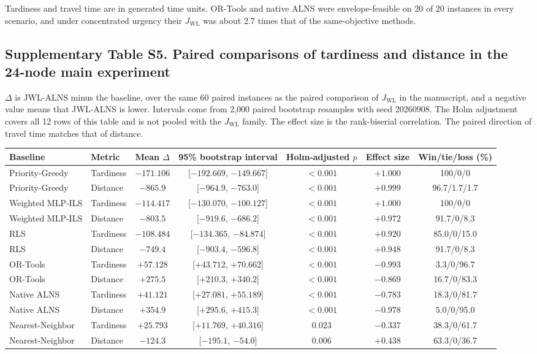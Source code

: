 \documentclass[11pt,a4paper]{article}
\begin{document}
Tardiness and travel time are in generated time units. OR-Tools and native ALNS were envelope-feasible on 20 of 20 instances in every scenario, and under concentrated urgency their $J_{\mathrm{WL}}$ was about 2.7 times that of the same-objective methods.

\subsection*{Supplementary Table S5. Paired comparisons of tardiness and distance in the 24-node main experiment}

$\Delta$ is JWL-ALNS minus the baseline, over the same 60 paired instances as the paired comparison of $J_{\mathrm{WL}}$ in the manuscript, and a negative value means that JWL-ALNS is lower. Intervals come from 2,000 paired bootstrap resamples with seed 20260908. The Holm adjustment covers all 12 rows of this table and is not pooled with the $J_{\mathrm{WL}}$ family. The effect size is the rank-biserial correlation. The paired direction of travel time matches that of distance.

\begin{center}
\scriptsize
\setlength{\tabcolsep}{3.5pt}
\begin{tabular}{llccccc}
\toprule
Baseline & Metric & Mean $\Delta$ & 95\% bootstrap interval & Holm-adjusted $p$ & Effect size & Win/tie/loss (\%) \\
\midrule
Priority-Greedy & Tardiness & $-171.106$ & [$-192.669$, $-149.667$] & $<0.001$ & $+1.000$ & 100/0/0 \\
Priority-Greedy & Distance & $-865.9$ & [$-964.9$, $-763.0$] & $<0.001$ & $+0.999$ & 96.7/1.7/1.7 \\
Weighted MLP-ILS & Tardiness & $-114.417$ & [$-130.070$, $-100.127$] & $<0.001$ & $+1.000$ & 100/0/0 \\
Weighted MLP-ILS & Distance & $-803.5$ & [$-919.6$, $-686.2$] & $<0.001$ & $+0.972$ & 91.7/0/8.3 \\
RLS & Tardiness & $-108.484$ & [$-134.365$, $-84.874$] & $<0.001$ & $+0.920$ & 85.0/0/15.0 \\
RLS & Distance & $-749.4$ & [$-903.4$, $-596.8$] & $<0.001$ & $+0.948$ & 91.7/0/8.3 \\
OR-Tools & Tardiness & $+57.128$ & [$+43.712$, $+70.662$] & $<0.001$ & $-0.993$ & 3.3/0/96.7 \\
OR-Tools & Distance & $+275.5$ & [$+210.3$, $+340.2$] & $<0.001$ & $-0.869$ & 16.7/0/83.3 \\
Native ALNS & Tardiness & $+41.121$ & [$+27.081$, $+55.189$] & $<0.001$ & $-0.783$ & 18.3/0/81.7 \\
Native ALNS & Distance & $+354.9$ & [$+295.6$, $+415.3$] & $<0.001$ & $-0.978$ & 5.0/0/95.0 \\
Nearest-Neighbor & Tardiness & $+25.793$ & [$+11.769$, $+40.316$] & $0.023$ & $-0.337$ & 38.3/0/61.7 \\
Nearest-Neighbor & Distance & $-124.3$ & [$-195.1$, $-54.0$] & $0.006$ & $+0.438$ & 63.3/0/36.7 \\
\bottomrule
\end{tabular}
\end{center}
\end{document}
